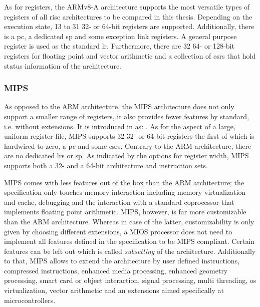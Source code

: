 As for registers, the ARMv8-A architecture supports the most versatile types of registers of all \gls{risc} architectures to be compared in this thesis.
Depending on the execution state, 13 to 31 32- or 64-bit registers are supported.
Additionally, there is a \gls{pc}, a dedicated \gls{sp} and some exception link registers.
A general purpose register is used as the standard \gls{lr}.
Furthermore, there are 32 64- or 128-bit registers for floating point and vector arithmetic and a collection of \glspl{csr} that hold status information of the architecture.

\subsubsection{MIPS}

As opposed to the ARM architecture, the MIPS architecture does not only support a smaller range of registers, it also provides fewer features by standard, i.e. without extensions.
It is introduced in  \cite{MIPS} as: .
As for the aspect of a large, uniform register file, MIPS supports 32 32- or 64-bit registers the first of which is hardwired to zero, a \gls{pc} and some \glspl{csr}.
Contrary to the ARM architecture, there are no dedicated \glspl{lr} or \gls{sp}.
As indicated by the options for register width, MIPS supports both a 32- and a 64-bit architecture and instruction sets.

MIPS comes with less features out of the box than the ARM architecture; the specification only touches memory interaction including memory virtualization and cache, debugging and the interaction with a standard coprocessor that implements floating point arithmetic.
MIPS, however, is far more customizable than the ARM architecture.
Whereas in case of the latter, customizability is only given by choosing different extensions, a MIOS processor does not need to implement all features defined in the specification to be MIPS compliant.
Certain features can be left out which is called \textit{subsetting} of the architecture.
Additionally to that, MIPS allows to extend the architecture by user defined instructions, compressed instructions, enhanced media processing, enhanced geometry processing, smart card or object interaction, signal processing, multi threading, \gls{os} virtualization, vector arithmetic and an extensions aimed specifically at microcontrollers.


